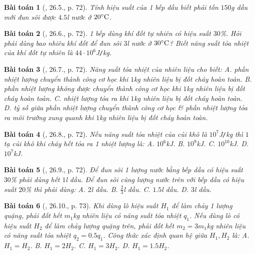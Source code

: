 \documentclass{article}
\newtheorem{baitoan}{Bài toán}
\begin{document}
\begin{baitoan}[\cite{SBT_Vat_Ly_8}, 26.5., p. 72]
	Tính hiệu suất của 1 bếp dầu biết phải tốn $150$\emph{g} dầu mới đun sôi được $4.5$\emph{l} nước ở $20^\circ{\rm C}$.
\end{baitoan}

\begin{baitoan}[\cite{SBT_Vat_Ly_8}, 26.6., p. 72]
	1 bếp dùng khí đốt tự nhiên có hiệu suất $30$\%. Hỏi phải dùng bao nhiêu khí đốt để đun sôi $3$\emph{l} nước ở $30^\circ{\rm C}$? Biết năng suất tỏa nhiệt của khí đốt tự nhiên là $44\cdot10^6$\emph{J\texttt{/}kg}.
\end{baitoan}

\begin{baitoan}[\cite{SBT_Vat_Ly_8}, 26.7., p. 72]
	Năng suất tỏa nhiệt của nhiên liệu cho biết: {\sf A.} phần nhiệt lượng chuyển thành công cơ học khi $1$\emph{kg} nhiên liệu bị đốt cháy hoàn toàn. {\sf B.} phần nhiệt lượng không được chuyển thành công cơ học khi $1$\emph{kg} nhiên liệu bị đốt cháy hoàn toàn. {\sf C.} nhiệt lượng tỏa ra khi $1$\emph{kg} nhiên liệu bị đốt cháy hoàn toàn. {\sf D.} tỷ số giữa phần nhiệt lượng chuyển thành công cơ học \& phần nhiệt lượng tỏa ra môi trường xung quanh khi $1$\emph{kg} nhiên liệu bị đốt cháy hoàn toàn.
\end{baitoan}

\begin{baitoan}[\cite{SBT_Vat_Ly_8}, 26.8., p. 72]
	Nếu năng suất tỏa nhiệt của củi khô là $10^7$\emph{J\texttt{/}kg} thì $1$ tạ củi khô khi cháy hết tỏa ra 1 nhiệt lượng là: {\sf A.} $10^6$\emph{kJ}. {\sf B.} $10^9$\emph{kJ}. {\sf C.} $10^{10}$\emph{kJ}. {\sf D.} $10^7$\emph{kJ}.
\end{baitoan}

\begin{baitoan}[\cite{SBT_Vat_Ly_8}, 26.9., p. 72]
	Để đun sôi 1 lượng nước bằng bếp dầu có hiệu suất $30$\% phải dùng hết $1$\emph{l} dầu. Để đun sôi cũng lượng nước trên với bếp dầu có hiệu suất $20$\% thì phải dùng: {\sf A.} $2$\emph{l} dầu. {\sf B.} $\frac{2}{3}$\emph{l} dầu. {\sf C.} $1.5$\emph{l} dầu. {\sf D.} $3$\emph{l} dầu.
\end{baitoan}

\begin{baitoan}[\cite{SBT_Vat_Ly_8}, 26.10., p. 73]
	Khi dùng lò hiệu suất $H_1$ để làm chảy 1 lượng quặng, phải đốt hết $m_1$\emph{kg} nhiên liệu có năng suất tỏa nhiệt $q_1$. Nếu dùng lò có hiệu suất $H_2$ để làm chảy lượng quặng trên, phải đốt hết $m_2 = 3m_1$\emph{kg} nhiên liệu có năng suất tỏa nhiệt $q_2 = 0.5q_1$. Công thức xác định quan hệ giữa $H_1,H_2$ là: {\sf A.} $H_1 = H_2$. {\sf B.} $H_1 = 2H_2$. {\sf C.} $H_1 = 3H_2$. {\sf D.} $H_1 = 1.5H_2$.
\end{baitoan}
\end{document}
